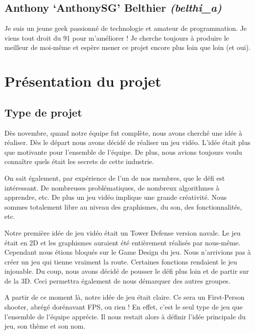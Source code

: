 \documentclass[a4paper, 11pt]{report}
\begin{document}
\subsection{Anthony `AnthonySG' Belthier \emph{(belthi\_a)}}\label{anthony-anthonysg-belthier-belthiux5fa}

Je suis un jeune geek passionné de technologie et amateur de programmation. Je viens tout droit du 91 pour m'améliorer ! Je cherche toujours à produire le meilleur de moi-même et espère mener ce projet encore plus loin que loin (et oui).

\newpage
\section{Présentation du projet}\label{pruxe9sentation-du-projet}

\subsection{Type de projet}\label{type-de-projet}

Dès novembre, quand notre équipe fut complète, nous avons cherché une idée à réaliser. Dès le départ nous avons décidé de réaliser un jeu vidéo. L'idée était plus que motivante pour l'ensemble de l'équipe. De plus, nous avions toujours voulu connaître quels était les secrets de cette industrie.

On sait également, par expérience de l'un de nos membres, que le défi est intéressant. De nombreuses problématiques, de nombreux algorithmes à apprendre, etc. De plus un jeu vidéo implique une grande créativité. Nous sommes totalement libre au niveau des graphismes, du son, des fonctionnalités, etc.

Notre première idée de jeu vidéo était un Tower Defense version navale. Le jeu était en 2D et les graphismes auraient été entièrement réalisés par nous-même. Cependant nous étions bloqués sur le Game Design du jeu. Nous n'arrivions pas à créer un jeu qui tienne vraiment la route. Certaines fonctions rendaient le jeu injouable. Du coup, nous avons décidé de pousser le défi plus loin et de partir sur de la 3D. Ceci permettra également de nous démarquer des autres groupes.

A partir de ce moment là, notre idée de jeu était claire. Ce sera un First-Person shooter, abrégé dorénavant FPS, ou rien ! En effet, c'est le seul type de jeu que l'ensemble de l'équipe apprécie. Il nous restait alors à définir l'idée principale du jeu, son thème et son nom.
\end{document}
